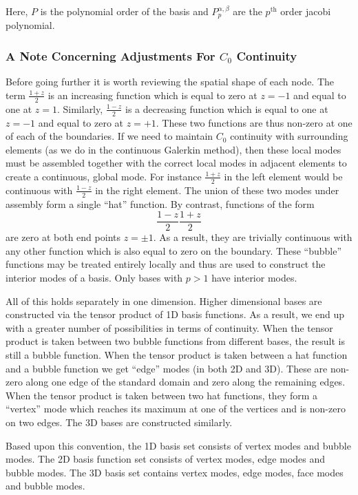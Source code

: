 Here, $P$ is the polynomial order of the basis and $P^{\alpha,\beta}_{p}$ are the $p^{\text{th}}$ order jacobi polynomial.

\subsubsection{A Note Concerning Adjustments For $C_0$ Continuity}


Before going further it is worth reviewing the spatial shape of each node. The term $\frac{1 + z}{2}$ is an increasing function which is equal to zero at $z = -1$ and equal to one at $z = 1$. Similarly, $\frac{1 - z}{2}$ is a decreasing function which is equal to one at $z = -1$ and equal to zero at $z = +1$. These two functions are thus non-zero at one of each of the boundaries. If we need to maintain $C_0$ continuity with surrounding elements (as we do in the continuous Galerkin method), then these local modes must be assembled together with the correct local modes in adjacent elements to create a continuous, global mode. For instance $\frac{1 + z}{2}$ in the left element would be continuous with $\frac{1 - z}{2}$ in the right element. The union of these two modes under assembly form a single ``hat'' function. By contrast, functions of the form
\[
    \frac{1 - z}{2} \frac{1 + z}{2}
\]
are zero at both end points $z = \pm 1$. As a result, they are trivially continuous with any other function which is also equal to zero on the boundary. These ``bubble'' functions may be treated entirely locally and thus are used to construct the interior modes of a basis. Only bases with $p > 1$ have interior modes.

All of this holds separately in one dimension. Higher dimensional bases are constructed via the tensor product of 1D basis functions. As a result, we end up with a greater number of possibilities in terms of continuity. When the tensor product is taken between two bubble functions from different bases, the result is still a bubble function. When the tensor product is taken between a hat function and a bubble function we get ``edge'' modes (in both 2D and 3D). These are non-zero along one edge of the standard domain and zero along the remaining edges. When the tensor product is taken between two hat functions, they form a ``vertex'' mode which reaches its maximum at one of the vertices and is non-zero on two edges.  The 3D bases are constructed similarly.

Based upon this convention, the 1D basis set consists of vertex modes and bubble modes.  The 2D basis function set consists of vertex modes, edge modes and bubble modes.  The 3D basis set contains vertex modes, edge modes, face modes and bubble modes.

